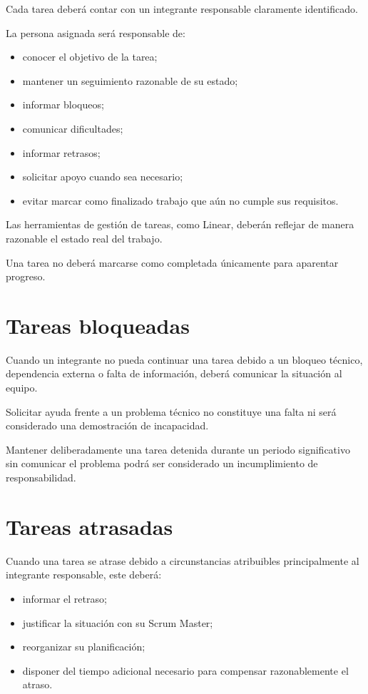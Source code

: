 \documentclass[12pt,a4paper]{article}
\begin{document}
Cada tarea deberá contar con un integrante responsable claramente identificado.

La persona asignada será responsable de:

\begin{itemize}
    \item conocer el objetivo de la tarea;
    \item mantener un seguimiento razonable de su estado;
    \item informar bloqueos;
    \item comunicar dificultades;
    \item informar retrasos;
    \item solicitar apoyo cuando sea necesario;
    \item evitar marcar como finalizado trabajo que aún no cumple sus requisitos.
\end{itemize}

Las herramientas de gestión de tareas, como Linear, deberán reflejar de manera razonable el estado real del trabajo.

Una tarea no deberá marcarse como completada únicamente para aparentar progreso.

\section{Tareas bloqueadas}

Cuando un integrante no pueda continuar una tarea debido a un bloqueo técnico, dependencia externa o falta de información, deberá comunicar la situación al equipo.

Solicitar ayuda frente a un problema técnico no constituye una falta ni será considerado una demostración de incapacidad.

Mantener deliberadamente una tarea detenida durante un periodo significativo sin comunicar el problema podrá ser considerado un incumplimiento de responsabilidad.

\section{Tareas atrasadas}

Cuando una tarea se atrase debido a circunstancias atribuibles principalmente al integrante responsable, este deberá:

\begin{itemize}
    \item informar el retraso;
    \item justificar la situación con su Scrum Master;
    \item reorganizar su planificación;
    \item disponer del tiempo adicional necesario para compensar razonablemente el atraso.
\end{itemize}
\end{document}
